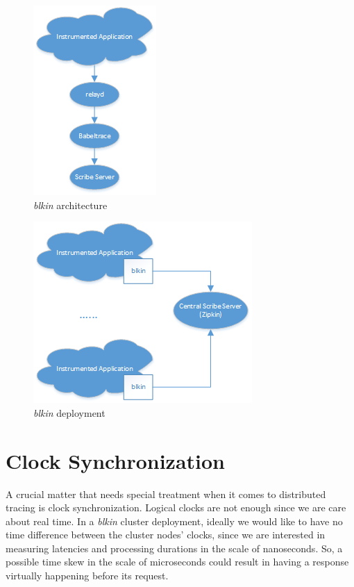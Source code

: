 \documentclass[a4paper,10pt,twocolumn]{article}
\begin{document}
\begin{figure}[h!]
  \centering
  \includegraphics[scale=0.75]{images/specific.png}
  \caption{\emph{blkin} architecture}
  \label{fig:specific}
\end{figure}

\begin{figure}[h!]
  \centering
  \includegraphics[scale=0.75]{images/generic.png}
  \caption{\emph{blkin} deployment}
  \label{fig:generic}
\end{figure}

\section{Clock Synchronization}

A crucial matter that needs special treatment when it comes to distributed
tracing is clock synchronization. Logical clocks are not enough since we are
care about real time. In a \emph{blkin} cluster deployment, ideally we would
like to have no time difference between the cluster nodes' clocks, since we are
interested in measuring latencies and processing durations in the scale of
nanoseconds. So, a possible time skew in the scale of microseconds could result
in having a response virtually happening before its request.
\end{document}
